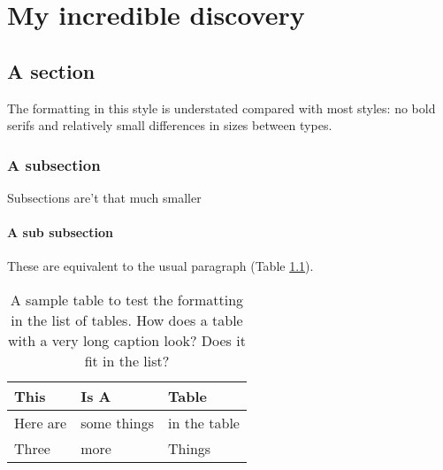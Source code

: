 \chapter{My incredible discovery}
\label{chap:incredible-discovery}

\section{A section}

The formatting in this style is understated compared with most styles:
no bold serifs and relatively small differences in sizes between types.

\subsection{A subsection}

Subsections are't that much smaller

\subsubsection{A sub subsection}

These are equivalent to the usual paragraph (Table \ref{table:sample}).

\begin{center}
\begin{table}[h]
\caption{A sample table to test the formatting in the list of tables.  How does
		 a table with a very long caption look?  Does it fit in the list?}
\label{table:sample}
\vspace{10pt}
\begin{tabular}[c]{l l l}
\hline
This 		& Is A 			& Table \\ \hline
Here are 	& some things	& in the table \\
Three		& more			& Things \\
\end{tabular}
\end{table}
\end{center}


